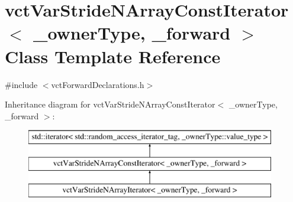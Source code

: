 \hypertarget{classvct_var_stride_n_array_const_iterator}{\section{vct\-Var\-Stride\-N\-Array\-Const\-Iterator$<$ \-\_\-owner\-Type, \-\_\-forward $>$ Class Template Reference}
\label{classvct_var_stride_n_array_const_iterator}
}


{\ttfamily \#include $<$vct\-Forward\-Declarations.\-h$>$}

Inheritance diagram for vct\-Var\-Stride\-N\-Array\-Const\-Iterator$<$ \-\_\-owner\-Type, \-\_\-forward $>$\-:\begin{figure}[H]
\begin{center}
\leavevmode
\includegraphics[height=3.000000cm]{dc/daf/classvct_var_stride_n_array_const_iterator}
\end{center}
\end{figure}
